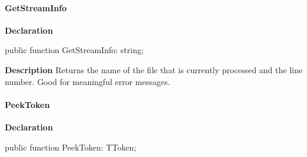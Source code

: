 \documentclass{report}
\newif\ifpdf
\begin{document}
\paragraph*{GetStreamInfo}\hspace*{\fill}

\label{PasDoc_Scanner.TScanner-GetStreamInfo}
\begin{list}{}{
\setlength{\itemindent}{0cm}
\setlength{\listparindent}{0cm}
\setlength{\leftmargin}{\evensidemargin}
\addtolength{\leftmargin}{\tmplength}
\settowidth{\labelsep}{X}
\addtolength{\leftmargin}{\labelsep}
\setlength{\labelwidth}{\tmplength}
}
\item[\textbf{Declaration}\hfill]
\ifpdf
\begin{flushleft}
\fi
\begin{ttfamily}
public function GetStreamInfo: string;\end{ttfamily}

\ifpdf
\end{flushleft}
\fi

\par
\item[\textbf{Description}]
Returns the name of the file that is currently processed and the line number. Good for meaningful error messages.

\end{list}
\paragraph*{PeekToken}\hspace*{\fill}

\label{PasDoc_Scanner.TScanner-PeekToken}
\begin{list}{}{
\setlength{\itemindent}{0cm}
\setlength{\listparindent}{0cm}
\setlength{\leftmargin}{\evensidemargin}
\addtolength{\leftmargin}{\tmplength}
\settowidth{\labelsep}{X}
\addtolength{\leftmargin}{\labelsep}
\setlength{\labelwidth}{\tmplength}
}
\item[\textbf{Declaration}\hfill]
\ifpdf
\begin{flushleft}
\fi
\begin{ttfamily}
public function PeekToken: TToken;\end{ttfamily}

\ifpdf
\end{flushleft}
\fi

\end{list}
\end{document}
